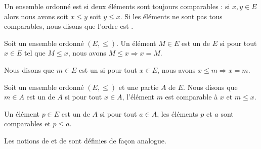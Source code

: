 \begin{definition}      \label{DEFooVGYQooUhUZGr}
    Un ensemble ordonné est  si deux éléments sont toujours comparables : si \( x,y\in E\) alors nous avons soit \( x\leq y\) soit \( y\leq x\). Si les éléments ne sont pas tous comparables, nous disons que l'ordre est .
\end{definition}

\begin{definition}        \label{DEFooBZNRooYRPGme}
    Soit un ensemble ordonné \( (E,\leq)\). Un élément \(M\in E\) est un  de \( E\) si pour tout \( x\in E\) tel que \( M\leq x\), nous avons \( M\leq x\Rightarrow x=M\).

    Nous disons que \( m\in E\) est un  si pour tout \( x\in E\), nous avons \( x\leq m\Rightarrow x=m\).
\end{definition}

\begin{definition}      \label{DEFooDNWRooTiMAzK}
    Soit un ensemble ordonné \( (E,\leq)\) et une partie \( A\) de \( E\). Nous disons que \( m\in A\) est un  de \( A\) si pour tout \( x\in A\), l'élément \( m\) est comparable à \( x\) et \( m\leq x\).

    Un élément \( p\in E\) est un  de \( A\) si pour tout \( a\in A\), les éléments \( p\) et \( a\) sont comparables et \( p\leq a\).

    Les notions de  et de  sont définies de façon analogue.
\end{definition}

